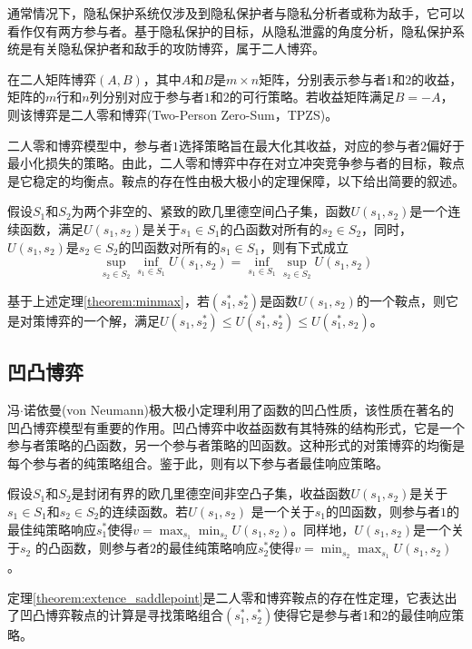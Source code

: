 通常情况下，隐私保护系统仅涉及到隐私保护者与隐私分析者或称为敌手，它可以看作仅有两方参与者\cite{dwork2014algorithmic}。基于隐私保护的目标，从隐私泄露的角度分析，隐私保护系统是有关隐私保护者和敌手的攻防博弈，属于二人博弈。
\begin{definition}
在二人矩阵博弈$(A,B)$，其中$A$和$B$是$m\times n$矩阵，分别表示参与者$1$和$2$的收益，矩阵的$m$行和$n$列分别对应于参与者$1$和$2$的可行策略。若收益矩阵满足$B=-A$，则该博弈是二人零和博弈(Two-Person Zero-Sum，TPZS)。
\end{definition}

二人零和博弈模型中，参与者$1$选择策略旨在最大化其收益，对应的参与者$2$偏好于最小化损失的策略。由此，二人零和博弈中存在对立冲突竞争参与者的目标，鞍点是它稳定的均衡点。鞍点的存在性由极大极小的定理保障，以下给出简要的叙述。
\begin{theorem}\label{theorem:minmax}假设$S_1$和$S_2$为两个非空的、紧致的欧几里德空间凸子集，函数$U(s_1,s_2)$是一个连续函数，满足$U(s_1,s_2)$是关于$s_1 \in S_1$的凸函数对所有的$s_2 \in S_2$，同时，$U(s_1,s_2)$是$s_2 \in S_2$的凹函数对所有的$s_1 \in S_1$，则有下式成立
\begin{equation}
	\sup_{s_2\in S_2}\inf_{ s_1\in S_1} U(s_1,s_2)= \inf_{ s_1\in S_1}\sup_{s_2\in S_2}U(s_1,s_2)
\end{equation}
\end{theorem}

基于上述定理\ref{theorem:minmax}，若$(s_1^*,s_2^*)$是函数$U(s_1,s_2)$的一个鞍点，则它是对策博弈的一个解，满足$U(s_1,s_2^*)\leq U(s_1^*,s_2^*)\leq U(s_1^*,s_2)$。
\subsection{凹凸博弈}\label{sec:chapter3_convex_concave_game}
冯$\cdot$诺依曼(von Neumann)极大极小定理利用了函数的凹凸性质，该性质在著名的凹凸博弈模型有重要的作用。凹凸博弈中收益函数有其特殊的结构形式，它是一个参与者策略的凸函数，另一个参与者策略的凹函数。这种形式的对策博弈的均衡是每个参与者的纯策略组合。鉴于此，则有以下参与者最佳响应策略。
\begin{theorem}\label{theorem:extence_saddlepoint}
	假设$S_1$和$S_2$是封闭有界的欧几里德空间非空凸子集，收益函数$U(s_1,s_2)$是关于$s_1 \in S_1$和$s_2 \in S_2$的连续函数。若$U(s_1,s_2)$ 是一个关于$s_1$的凹函数，则参与者$1$的最佳纯策略响应$s_1^* $使得$v= \max_{s_1} \min_{s_2}U(s_1,s_2)$。同样地，$U(s_1,s_2)$是一个关于$s_2$ 的凸函数，则参与者$2$的最佳纯策略响应$s_2^* $使得$ v=  \min_{s_2}\max_{s_1}U(s_1,s_2)$。
\end{theorem}
定理\ref{theorem:extence_saddlepoint}是二人零和博弈鞍点的存在性定理，它表达出了凹凸博弈鞍点的计算是寻找策略组合$(s_1^*,s_2^*)$使得它是参与者$1$和$2$的最佳响应策略。
